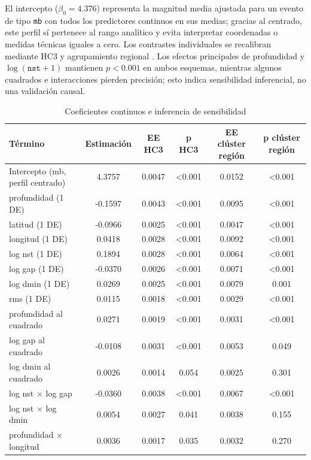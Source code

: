 \documentclass{style}
\newcommand{\var}[1]{\texttt{#1}}
\begin{document}
El intercepto ($\beta_0 = 4.376$) representa la magnitud media ajustada para un evento de tipo \texttt{mb} con todos los predictores continuos en sus medias; gracias al centrado, este perfil sí pertenece al rango analítico y evita interpretar coordenadas o medidas técnicas iguales a cero. Los contrastes individuales se recalibran mediante HC3 \cite{mackinnonwhite1985} y agrupamiento regional \cite{cameronmiller2015}. Los efectos principales de profundidad y $\log(\var{nst}+1)$ mantienen $p<0.001$ en ambos esquemas, mientras algunos cuadrados e interacciones pierden precisión; esto indica sensibilidad inferencial, no una validación causal.






\begin{table}[H]
    \centering
    \caption{Coeficientes continuos e inferencia de sensibilidad}
    \scriptsize
    \setlength{\tabcolsep}{8pt} 
    \begin{tabular}{lccccc}
    \toprule
    \textbf{Término} & \textbf{Estimación} & \textbf{EE HC3} & \textbf{p HC3} & \textbf{EE clúster región} & \textbf{p clúster región} \\
    \midrule
    Intercepto (mb, perfil centrado) & 4.3757 & 0.0047 & <0.001 & 0.0152 & <0.001 \\
    profundidad (1 DE) & -0.1597 & 0.0043 & <0.001 & 0.0095 & <0.001 \\
    latitud (1 DE) & -0.0966 & 0.0025 & <0.001 & 0.0047 & <0.001 \\
    longitud (1 DE) & 0.0418 & 0.0028 & <0.001 & 0.0092 & <0.001 \\
    log nst (1 DE) & 0.1894 & 0.0028 & <0.001 & 0.0064 & <0.001 \\
    log gap (1 DE) & -0.0370 & 0.0026 & <0.001 & 0.0071 & <0.001 \\
    log dmin (1 DE) & 0.0269 & 0.0025 & <0.001 & 0.0079 & 0.001 \\
    rms (1 DE) & 0.0115 & 0.0018 & <0.001 & 0.0029 & <0.001 \\
    profundidad al cuadrado & 0.0271 & 0.0019 & <0.001 & 0.0031 & <0.001 \\
    log gap al cuadrado & -0.0108 & 0.0031 & <0.001 & 0.0053 & 0.049 \\
    log dmin al cuadrado & 0.0026 & 0.0014 & 0.054 & 0.0025 & 0.301 \\
    log nst $\times$ log gap & -0.0360 & 0.0038 & <0.001 & 0.0067 & <0.001 \\
    log nst $\times$ log dmin & 0.0054 & 0.0027 & 0.041 & 0.0038 & 0.155 \\
    profundidad $\times$ longitud & 0.0036 & 0.0017 & 0.035 & 0.0032 & 0.270 \\
    \bottomrule
    \end{tabular}
\end{table}
\end{document}
